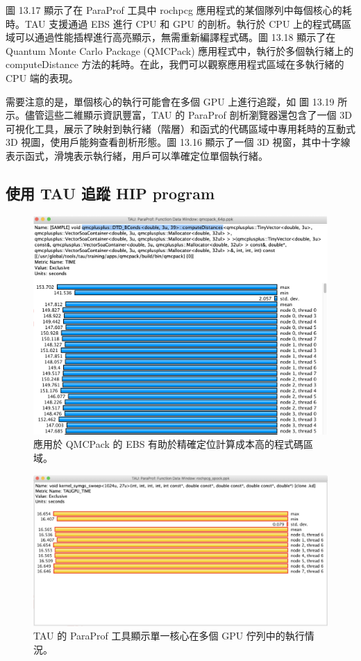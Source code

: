 圖 13.17 顯示了在 ParaProf 工具中 rochpcg 應用程式的某個隊列中每個核心的耗時。TAU 支援通過 EBS 進行 CPU 和 GPU 的剖析。執行於 CPU 上的程式碼區域可以通過性能插桿進行高亮顯示，無需重新編譯程式碼。圖 13.18 顯示了在 Quantum Monte Carlo Package (QMCPack) 應用程式中，執行於多個執行緒上的 computeDistance 方法的耗時。在此，我們可以觀察應用程式區域在多執行緒的 CPU 端的表現。

需要注意的是，單個核心的執行可能會在多個 GPU 上進行追蹤，如 圖 13.19 所示。儘管這些二維顯示資訊豐富，TAU 的 ParaProf 剖析瀏覽器還包含了一個 3D 可視化工具，展示了映射到執行緒（階層）和函式的代碼區域中專用耗時的互動式 3D 視圖，使用戶能夠查看剖析形態。圖 13.16 顯示了一個 3D 視窗，其中十字線表示函式，滑塊表示執行緒，用戶可以準確定位單個執行緒。


\subsection{使用 TAU 追蹤 HIP program}


\begin{figure}
    \centering
    \includegraphics[width=0.9\linewidth]{FileAusiliari/Screenshots/Figure13-18.png}
    \caption{應用於 QMCPack 的 EBS 有助於精確定位計算成本高的程式碼區域。}
    \label{fig:PAPI18}
\end{figure}

\begin{figure}
    \centering
    \includegraphics[width=0.9\linewidth]{FileAusiliari/Screenshots/Figure13-19.png}
    \caption{TAU 的 ParaProf 工具顯示單一核心在多個 GPU 佇列中的執行情況。}
    \label{fig:PAPI19}
\end{figure}

